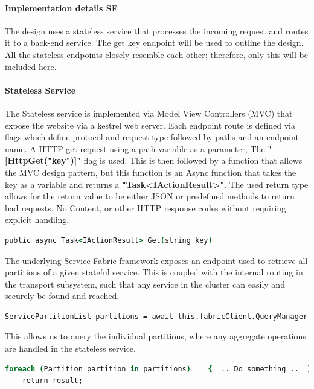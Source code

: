 \documentclass[a4paper,10pt,titlepage]{report}
\begin{document}
\paragraph*{Implementation details SF}

The design uses a stateless service that processes the incoming request and routes it to a back-end service. The get key endpoint will be used to outline the design. All the stateless endpoints closely resemble each other; therefore, only this will be included here.\\
        
\paragraph*{Stateless Service}
The Stateless service is implemented via Model View Controllers (MVC) that expose the website via a kestrel web server. Each endpoint route is defined via flags which define protocol and request type followed by paths and an endpoint name. A HTTP get request using a path variable as a parameter, The \textbf{"[HttpGet("{key}")]"} flag is used. This is then followed by a function that allows the MVC design pattern, but this function is an Async function that takes the key as a variable and returns a \textbf{"Task<IActionResult>"}. The used return type allows for the return value to be either JSON or predefined methods to return bad requests, No Content, or other HTTP response codes without requiring explicit handling.
\begin{lstlisting}[language=csh]
public async Task<IActionResult> Get(string key)
\end{lstlisting}   

The underlying Service Fabric framework exposes an endpoint used to retrieve all partitions of a given stateful service. This is coupled with the internal routing in the transport subsystem, such that any service in the cluster can easily and securely be found and reached. 
\begin{lstlisting}[language=csh]
    ServicePartitionList partitions = await this.fabricClient.QueryManager.GetPartitionListAsync(serviceName);
\end{lstlisting}   
This allows us to query the individual partitions, where any aggregate operations are handled in the stateless service.
\begin{lstlisting}[language=csh]
    foreach (Partition partition in partitions)    {  .. Do something ..  }
    return result;
\end{lstlisting}  
\end{document}
